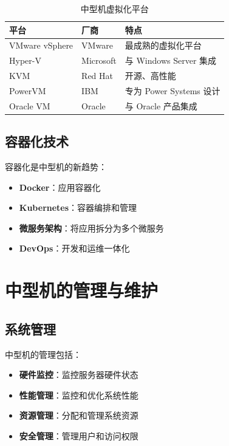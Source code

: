 \documentclass[12pt,UTF8]{ctexbook}
\begin{document}
\begin{table}[htbp]
    \centering
    \caption{中型机虚拟化平台}
    \begin{tabular}{|p{3cm}|p{3cm}|p{4cm}|}
        \hline
        \textbf{平台} & \textbf{厂商} & \textbf{特点} \\
        \hline
        VMware vSphere & VMware & 最成熟的虚拟化平台 \\
        \hline
        Hyper-V & Microsoft & 与 Windows Server 集成 \\
        \hline
        KVM & Red Hat & 开源、高性能 \\
        \hline
        PowerVM & IBM & 专为 Power Systems 设计 \\
        \hline
        Oracle VM & Oracle & 与 Oracle 产品集成 \\
        \hline
    \end{tabular}
\end{table}

\section{容器化技术}

容器化是中型机的新趋势：

\begin{itemize}[leftmargin=2cm]
    \item \textbf{Docker}：应用容器化
    \item \textbf{Kubernetes}：容器编排和管理
    \item \textbf{微服务架构}：将应用拆分为多个微服务
    \item \textbf{DevOps}：开发和运维一体化
\end{itemize}

\chapter{中型机的管理与维护}
\label{chap:management}

\section{系统管理}

中型机的管理包括：

\begin{itemize}[leftmargin=2cm]
    \item \textbf{硬件监控}：监控服务器硬件状态
    \item \textbf{性能管理}：监控和优化系统性能
    \item \textbf{资源管理}：分配和管理系统资源
    \item \textbf{安全管理}：管理用户和访问权限
\end{itemize}
\end{document}
